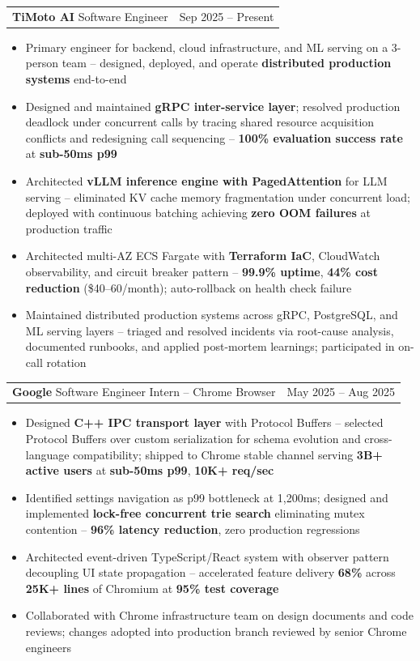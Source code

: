 \documentclass[letterpaper,11pt]{article}
\makeatletter
\newcommand{\resumeItem}[1]{
  \item\small{{#1 \vspace{-2pt}}}
}
\newcommand{\resumeSubheadingShortSplit}[3]{%
  \vspace{-2pt}\item
    \begin{tabular*}{0.98\textwidth}[t]{l@{\extracolsep{\fill}}r}
      {\normalsize\textbf{#1}} \textbar{} {\normalsize #2} & {\normalsize #3} \\
    \end{tabular*}\vspace{-7pt}
}
\newcommand{\resumeItemListStart}{\begin{itemize}}
\newcommand{\resumeItemListEnd}{\end{itemize}\vspace{-5pt}}
\makeatother
\begin{document}
    \resumeSubheadingShortSplit
      {TiMoto AI}{Software Engineer}{Sep 2025 -- Present}
        \resumeItemListStart
          \resumeItem{Primary engineer for backend, cloud infrastructure, and ML serving on a 3-person team -- designed, deployed, and operate \textbf{distributed production systems} end-to-end}
          \resumeItem{Designed and maintained \textbf{gRPC inter-service layer}; resolved production deadlock under concurrent calls by tracing shared resource acquisition conflicts and redesigning call sequencing --
      \textbf{100\% evaluation success rate} at \textbf{sub-50ms p99}}
          \resumeItem{Architected \textbf{vLLM inference engine with PagedAttention} for LLM serving -- eliminated KV cache memory fragmentation under concurrent load; deployed with continuous batching achieving \textbf{zero OOM
       failures} at production traffic}
          \resumeItem{Architected multi-AZ ECS Fargate with \textbf{Terraform IaC}, CloudWatch observability, and circuit breaker pattern -- \textbf{99.9\% uptime}, \textbf{44\% cost reduction} (\$40--60/month); auto-rollback on
       health check failure}
          \resumeItem{Maintained distributed production systems across gRPC, PostgreSQL, and ML serving layers -- triaged and resolved incidents via root-cause analysis, documented runbooks, and applied post-mortem learnings;
      participated in on-call rotation}
      \resumeItemListEnd

    \resumeSubheadingShortSplit
      {Google}{Software Engineer Intern -- Chrome Browser}{May 2025 -- Aug 2025}
      \resumeItemListStart
        \resumeItem{Designed \textbf{C++ IPC transport layer} with Protocol Buffers -- selected Protocol Buffers over custom serialization for schema evolution and cross-language compatibility; shipped to Chrome stable channel serving \textbf{3B+ active users} at \textbf{sub-50ms p99}, \textbf{10K+ req/sec}}
        \resumeItem{Identified settings navigation as p99 bottleneck at 1,200ms; designed and implemented \textbf{lock-free concurrent trie search} eliminating mutex contention -- \textbf{96\% latency reduction}, zero production regressions}
        \resumeItem{Architected event-driven TypeScript/React system with observer pattern decoupling UI state propagation -- accelerated feature delivery \textbf{68\%} across \textbf{25K+ lines} of Chromium at \textbf{95\% test coverage}}
        \resumeItem{Collaborated with Chrome infrastructure team on design documents and code reviews; changes adopted into production branch reviewed by senior Chrome engineers}
      \resumeItemListEnd
\end{document}
